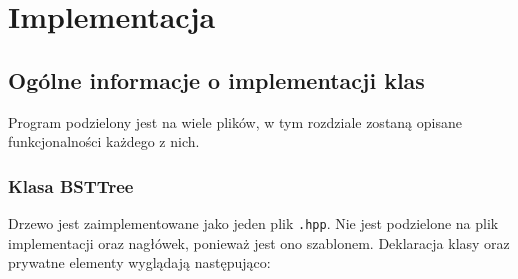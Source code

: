 	\newpage
\section{Implementacja}		%

\subsection{Ogólne informacje o implementacji klas}

Program podzielony jest na wiele plików, w tym rozdziale zostaną opisane funkcjonalności każdego z nich.

\subsubsection{Klasa BSTTree}

Drzewo jest zaimplementowane jako jeden plik \texttt{.hpp}. Nie jest podzielone na plik implementacji oraz nagłówek, ponieważ jest ono szablonem. Deklaracja klasy oraz prywatne elementy wyglądają następująco:

